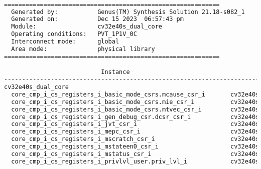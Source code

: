\begin{lstlisting}[caption={Area report from synthesis of the CV32E40SDC.}, label=lst:cv32e40dc_area, language=txt]

============================================================
  Generated by:           Genus(TM) Synthesis Solution 21.18-s082_1
  Generated on:           Dec 15 2023  06:57:43 pm
  Module:                 cv32e40s_dual_core
  Operating conditions:   PVT_1P1V_0C 
  Interconnect mode:      global
  Area mode:              physical library
============================================================

                           Instance                                                  Module                        Cell Count  Cell Area  Net Area   Total Area 
----------------------------------------------------------------------------------------------------------------------------------------------------------------
cv32e40s_dual_core                                                                                                      29351  97142.022 43445.210   140587.232 
  core_cmp_i_cs_registers_i_basic_mode_csrs.mcause_csr_i       cv32e40s_csr_LIB0_WIDTH32_SHADOWCOPY1_RESETVALUE0_          29     43.776    39.057       82.833 
  core_cmp_i_cs_registers_i_basic_mode_csrs.mie_csr_i          cv32e40s_csr_LIB0_WIDTH32_SHADOWCOPY1_RESETVALUE0_          44     69.084    60.059      129.143 
  core_cmp_i_cs_registers_i_basic_mode_csrs.mtvec_csr_i        cv32e40s_csr_LIB0_WIDTH32_SHADOWCOPY1_RESETVALUE1_          62     96.102    84.367      180.469 
  core_cmp_i_cs_registers_i_gen_debug_csr.dcsr_csr_i           cv32e40s_csr_LIB0_WIDTH32_SHADOWCOPY1_RESETVALUE10          24     35.568    33.868       69.436 
  core_cmp_i_cs_registers_i_jvt_csr_i                          cv32e40s_csr_LIB0_WIDTH32_SHADOWCOPY1_RESETVALUE0_          62     96.102    84.367      180.469 
  core_cmp_i_cs_registers_i_mepc_csr_i                         cv32e40s_csr_LIB0_WIDTH32_SHADOWCOPY1_RESETVALUE0_          72    113.886    98.736      212.622 
  core_cmp_i_cs_registers_i_mscratch_csr_i                     cv32e40s_csr_LIB0_WIDTH32_SHADOWCOPY1_RESETVALUE0_          75    116.964   102.062      219.026 
  core_cmp_i_cs_registers_i_mstateen0_csr_i                    cv32e40s_csr_LIB0_WIDTH32_SHADOWCOPY1_RESETVALUE0_           2      3.078     2.585        5.663 
  core_cmp_i_cs_registers_i_mstatus_csr_i                      cv32e40s_csr_LIB0_WIDTH32_SHADOWCOPY1_RESETVALUE61          14     22.572    19.519       42.091 
  core_cmp_i_cs_registers_i_privlvl_user.priv_lvl_i            cv32e40s_csr_LIB0_WIDTH2_SHADOWCOPY1_RESETVALUE3_M           5      7.524     6.272       13.796 

\end{lstlisting}
